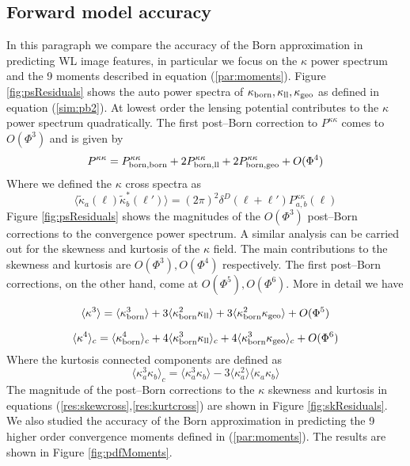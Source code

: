 \documentclass[reprint,aps,prd,superscriptaddress,showkeys,showpacs]{revtex4-1}
\begin{document}
\subsection{Forward model accuracy}

In this paragraph we compare the accuracy of the Born approximation in predicting WL image features, in particular we focus on the $\kappa$ power spectrum and the 9 moments described in equation (\ref{par:moments}). Figure \ref{fig:psResiduals} shows the auto power spectra of $\kappa_{\rm born},\kappa_{\rm ll},\kappa_{\rm geo}$ as defined in equation (\ref{sim:pb2}). At lowest order the lensing potential contributes to the $\kappa$ power spectrum quadratically. The first post--Born correction to $P^{\kappa\kappa}$ comes to $O(\Phi^3)$ and is given by
\begin{equation}
\label{res:powercorr}
P^{\kappa\kappa} = P^{\kappa\kappa}_{\rm born,born} + 2P^{\kappa\kappa}_{\rm born,ll} + 2P^{\kappa\kappa}_{\rm born,geo} + O(\Phi^4)
\end{equation}
%
Where we defined the $\kappa$ cross spectra as
\begin{equation}
\label{res:powercross}
\langle\tilde{\kappa}_a(\pmb{\ell})\tilde{\kappa}_b^*(\pmb{\ell}')\rangle = (2\pi)^2\delta^D(\pmb{\ell}+\pmb{\ell}')P_{a,b}^{\kappa\kappa}(\ell)
\end{equation} 
%
Figure \ref{fig:psResiduals} shows the magnitudes of the $O(\Phi^3)$ post--Born corrections to the convergence power spectrum. 
A similar analysis can be carried out for the skewness and kurtosis of the $\kappa$ field. The main contributions to the skewness and kurtosis are $O(\Phi^3),O(\Phi^4)$ respectively. The first post--Born corrections, on the other hand, come at $O(\Phi^5),O(\Phi^6)$. More in detail we have

\begin{equation}
\label{res:skewcross}
\langle\kappa^3\rangle = \langle\kappa_{\rm born}^3\rangle + 3\langle\kappa_{\rm born}^2\kappa_{\rm ll}\rangle + 3\langle\kappa_{\rm born}^2\kappa_{\rm geo}\rangle + O(\Phi^5) 
\end{equation}

\begin{equation}
\label{res:kurtcross}
\langle\kappa^4\rangle_c = \langle\kappa_{\rm born}^4\rangle_c + 4\langle\kappa_{\rm born}^3\kappa_{\rm ll}\rangle_c + 4\langle\kappa_{\rm born}^3\kappa_{\rm geo}\rangle_c + O(\Phi^6)
\end{equation}
%
Where the kurtosis connected components are defined as 
\begin{equation}
\label{res:kurtconnected}
\langle\kappa^3_a\kappa_b\rangle_c = \langle\kappa^3_a\kappa_b\rangle - 3\langle\kappa_a^2\rangle\langle\kappa_a\kappa_b\rangle
\end{equation}
The magnitude of the post--Born corrections to the $\kappa$ skewness and kurtosis in equations (\ref{res:skewcross},\ref{res:kurtcross}) are shown in Figure \ref{fig:skResiduals}.
We also studied the accuracy of the Born approximation in predicting the 9 higher order convergence moments defined in (\ref{par:moments}). The results are shown in Figure \ref{fig:pdfMoments}.
\end{document}
